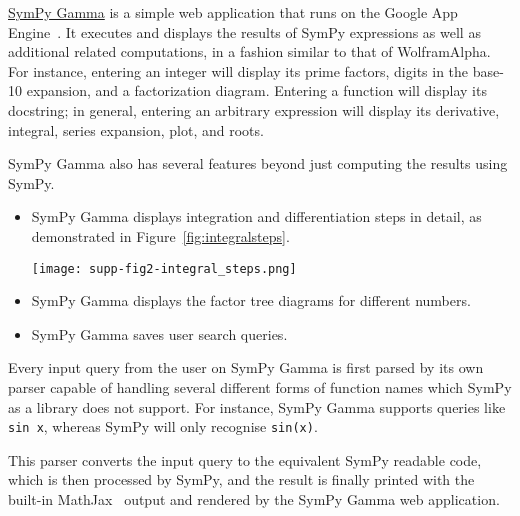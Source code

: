\href{http://sympygamma.com}{SymPy Gamma} is a simple web application that
runs on the Google App Engine~\cite{ciurana2009google}. It executes and
displays the results of SymPy expressions as well as additional related
computations, in a fashion similar to that of Wolfram\textbar{}Alpha. For
instance, entering an integer will display its prime factors, digits in the
base-10 expansion, and a factorization diagram. Entering a function will
display its docstring; in general, entering an arbitrary expression will
display its derivative, integral, series expansion, plot, and roots.

SymPy Gamma also has several features beyond just computing the
results using SymPy.

\begin{itemize}
\item
  SymPy Gamma displays integration and differentiation steps in detail, as
  demonstrated in Figure~\ref{fig:integralsteps}.\par
  {
    \centering
    \texttt{[image: supp-fig2-integral\_steps.png]}
    \label{fig:integralsteps}
    \par
  }
\item
  SymPy Gamma displays the factor tree diagrams for different numbers.
\item
  SymPy Gamma saves user search queries.
\end{itemize}
Every input query from the user on SymPy Gamma is first parsed by its
own parser capable of handling several different forms of function names
which SymPy as a library does not support. For instance, SymPy Gamma
supports queries like \texttt{sin\ x}, whereas SymPy will only recognise
\verb|sin(x)|.

This parser converts the input query to the equivalent SymPy readable code,
which is then processed by SymPy, and the result is finally printed with the
built-in MathJax~\cite{cervone2012mathjax} output and rendered by the SymPy
Gamma web application.
